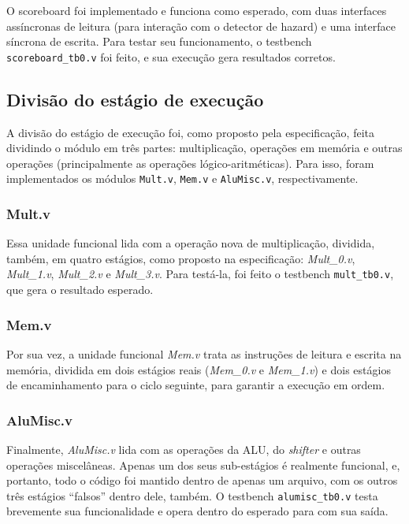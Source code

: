 \documentclass[12pt,a4paper]{article}
\numberwithin{equation}{section}
\begin{document}
O scoreboard foi implementado e funciona como esperado, com duas interfaces assíncronas de leitura (para interação com o detector de hazard) e uma interface síncrona de escrita. Para testar seu funcionamento, o testbench \verb|scoreboard_tb0.v| foi feito, e sua execução gera resultados corretos.

\subsection{Divisão do estágio de execução}

A divisão do estágio de execução foi, como proposto pela especificação, feita dividindo o módulo em três partes: multiplicação, operações em memória e outras operações (principalmente as operações lógico-aritméticas). Para isso, foram implementados os módulos \verb|Mult.v|, \verb|Mem.v| e \verb|AluMisc.v|, respectivamente.

\subsubsection{Mult.v}

Essa unidade funcional lida com a operação nova de multiplicação, dividida, também, em quatro estágios, como proposto na especificação: \emph{Mult\_0.v}, \emph{Mult\_1.v}, \emph{Mult\_2.v} e \emph{Mult\_3.v}. Para testá-la, foi feito o testbench \verb|mult_tb0.v|, que gera o resultado esperado.

\subsubsection{Mem.v}

Por sua vez, a unidade funcional \emph{Mem.v} trata as instruções de leitura e escrita na memória, dividida em dois estágios reais (\emph{Mem\_0.v} e \emph{Mem\_1.v}) e dois estágios de encaminhamento para o ciclo seguinte, para garantir a execução em ordem.

\subsubsection{AluMisc.v}

Finalmente, \emph{AluMisc.v} lida com as operações da ALU, do \emph{shifter} e outras operações miscelâneas. Apenas um dos seus sub-estágios é realmente funcional, e, portanto, todo o código foi mantido dentro de apenas um arquivo, com os outros três estágios ``falsos'' dentro dele, também. O testbench \verb|alumisc_tb0.v| testa brevemente sua funcionalidade e opera dentro do esperado para com sua saída.
\end{document}
